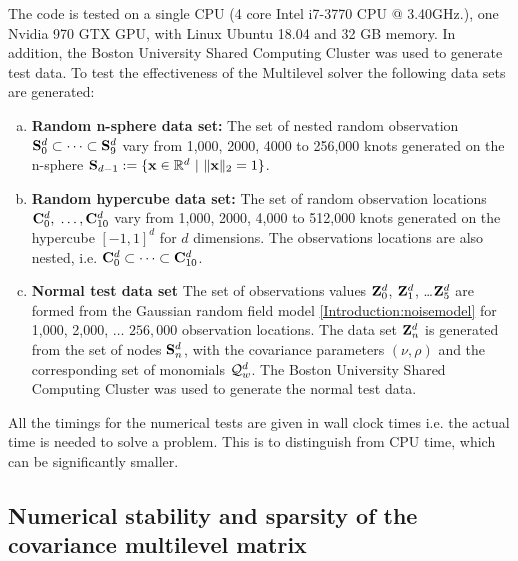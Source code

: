 \documentclass[11pt,final]{amsart}       %
\begin{document}
The code is tested on a single CPU (4 core Intel i7-3770 CPU @
3.40GHz.), one Nvidia 970 GTX GPU, with Linux Ubuntu 18.04 and 32 GB
memory. In addition, the Boston University Shared Computing Cluster
was used to generate test data.  To test the effectiveness of the
Multilevel solver the following data sets are generated:
\begin{enumerate}[a)]


\item {\bf Random n-sphere data set:} The set of nested random
  observation $\mathbf{S}_{0}^{d} \subset \dots \subset \mathbf{S}_{9}^{d}$ vary
  from 1,000, 2000, 4000 to 256,000 knots generated on the n-sphere
  $\mathbf{S}_{d-1} := \{\mathbf{x} \in \Bbb{R}^{d}\,\,|\,\,\|\mathbf{x}\|_{2} = 1 \}$.

\item {\bf Random hypercube data set:} The set of random observation
  locations $\mathbf{C}_{0}^{d},$ $\dots, \mathbf{C}_{10}^{d}$ vary from 1,000, 2000,
  4,000 to 512,000 knots generated on the hypercube $[-1,1]^{d}$ for
  $d$ dimensions.  The observations locations are also nested,
  i.e. $\mathbf{C}_{0}^{d} \subset \dots \subset \mathbf{C}_{10}^{d}$.
  
\item {\bf Normal test data set} The set of observations values
  $\mathbf{Z}^d_{0}$, $\mathbf{Z}^d_{1}$, \dots $\mathbf{Z}^d_{5}$ are formed from the
  Gaussian random field model \eqref{Introduction:noisemodel} for
  1,000, 2,000, $\dots$ $256,000$ observation locations. The data set
  $\mathbf{Z}^d_{n}$ is generated from the set of nodes $\mathbf{S}^{d}_{n}$, with
  the covariance parameters $(\nu,\rho)$ and the corresponding set of
  monomials ${\mathcal Q}^d_w$. The Boston University Shared Computing Cluster
  was used to generate the normal test data.
    
  
\end{enumerate}


\begin{remark}
 All the timings for the numerical tests are given in wall clock
 times i.e. the actual time is needed to solve a problem. This is to
 distinguish from CPU time, which can be significantly smaller.
  \end{remark}


\subsection{Numerical stability and sparsity of the covariance multilevel
  matrix}
\end{document}
